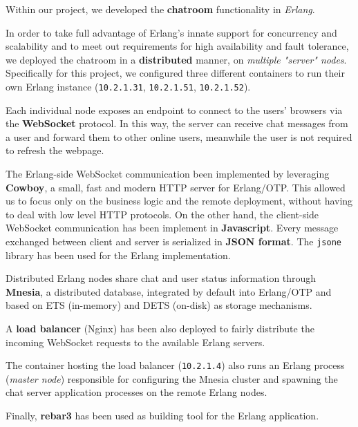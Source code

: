 Within our project, we developed the \textbf{chatroom} functionality in \textit{Erlang}.

In order to take full advantage of Erlang's innate support for concurrency and scalability and to meet out requirements for high availability and fault tolerance, we deployed the chatroom in a \textbf{distributed} manner, on \textit{multiple "server" nodes}. Specifically for this project, we configured three different containers to run their own Erlang instance (\texttt{10.2.1.31}, \texttt{10.2.1.51}, \texttt{10.2.1.52}).

Each individual node exposes an endpoint to connect to the users' browsers via the \textbf{WebSocket} protocol. In this way, the server can receive chat messages from a user and forward them to other online users, meanwhile the user is not required to refresh the webpage.

The Erlang-side WebSocket communication been implemented by leveraging \textbf{Cowboy}, a small, fast and modern HTTP server for Erlang/OTP. This allowed us to focus only on the business logic and the remote deployment, without having to deal with low level HTTP protocols.
On the other hand, the client-side WebSocket communication has been implement in \textbf{Javascript}.
Every message exchanged between client and server is serialized in \textbf{JSON format}.
The \texttt{jsone} library has been used for the Erlang implementation.

Distributed Erlang nodes share chat and user status information through \textbf{Mnesia}, a distributed database, integrated by default into Erlang/OTP and based on ETS (in-memory) and DETS (on-disk) as storage mechanisms.

A \textbf{load balancer} (Nginx) has been also deployed to fairly distribute the incoming WebSocket requests to the available Erlang servers.

The container hosting the load balancer (\texttt{10.2.1.4}) also runs an Erlang process (\textit{master node}) responsible for configuring the Mnesia cluster and spawning the chat server application processes on the remote Erlang nodes.

Finally, \textbf{rebar3} has been used as building tool for the Erlang application.
